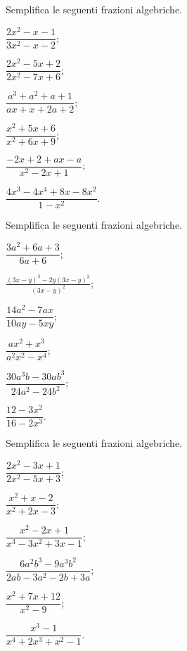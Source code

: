 \begin{esercizio}[\Ast]
\label{ese:14.5}
Semplifica le seguenti frazioni algebriche.
\begin{multicols}{3}
\begin{enumeratea}
 \item $\dfrac{2x^{2}-x-1}{3x^{2}-x-2}$;
 \item $\dfrac{2x^{2}-5x+2}{2x^{2}-7x+6}$;
 \item $\dfrac{a^{3}+a^{2}+a+1}{ax+x+2a+2}$;
 \item $\dfrac{x^{2}+5x+6}{x^{2}+6x+9}$;
 \item $\dfrac{-2x+2+ax-a}{x^{2}-2x+1}$;
 \item $\dfrac{4x^{3}-4x^{4}+8x-8x^{2}}{1-x^{2}}$.
\end{enumeratea}
\end{multicols}
\end{esercizio}
\pagebreak

\begin{esercizio}[\Ast]
\label{ese:14.6}
Semplifica le seguenti frazioni algebriche.
\begin{multicols}{3}
\begin{enumeratea}
 \item $\dfrac{3a^{2}+6a+3}{6a+6}$;
 \item $\frac{(3x-y)^{3}-2y(3x-y)^{2}}{(3x-y)^{2}}$;
 \item $\dfrac{14a^{2}-7ax}{10ay-5xy}$;
 \item $\dfrac{ax^{2}+x^{3}}{a^{2}x^{2}-x^{4}}$;
 \item $\dfrac{30a^{3}b-30ab^{3}}{24a^{2}-24b^{2}}$;
 \item $\dfrac{12-3x^{2}}{16-2x^{3}}$.
\end{enumeratea}
\end{multicols}
\end{esercizio}

\begin{esercizio}[\Ast]
\label{ese:14.7}
Semplifica le seguenti frazioni algebriche.
\begin{multicols}{3}
\begin{enumeratea}
 \item $\dfrac{2x^{2}-3x+1}{2x^{2}-5x+3}$;
 \item $\dfrac{x^{2}+x-2}{x^{2}+2x-3}$;
 \item $\dfrac{x^{2}-2x+1}{x^{3}-3x^{2}+3x-1}$;
 \item $\dfrac{6a^{2}b^{3}-9a^{3}b^{2}}{2ab-3a^{2}-2b+3a}$;
 \item $\dfrac{x^{2}+7x+12}{x^{2}-9}$;
 \item $\dfrac{x^{3}-1}{x^{4}+2x^{3}+x^{2}-1}$.
\end{enumeratea}
\end{multicols}
\end{esercizio}

